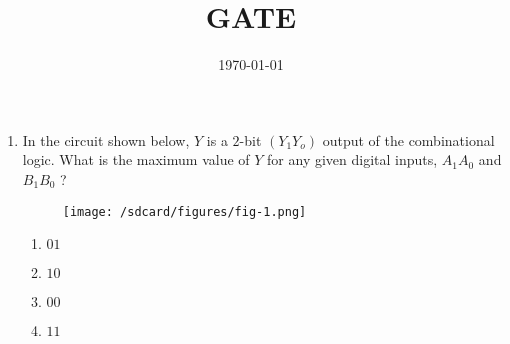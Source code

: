 \documentclass[12pt]{article}
\begin{document}
\title{GATE}
\date{\today}
\maketitle
\begin{enumerate}
\item In the circuit shown below, $Y$ is a $2$-bit $(Y_1Y_o)$ output of the combinational logic. What is the 
maximum value of $Y$ for any given digital inputs, $A_1A_0$ and $B_1B_0$ ?
\begin{figure}[H]
\centering
\texttt{[image: /sdcard/figures/fig-1.png]}
\caption{}
\label{fig:fig-1.png}
\end{figure}
\begin{enumerate}[label=(\Alph*)]
\item $01$
\item $10$
\item $00$
\item $11$
\end{enumerate}
\end{enumerate}
\end{document}
